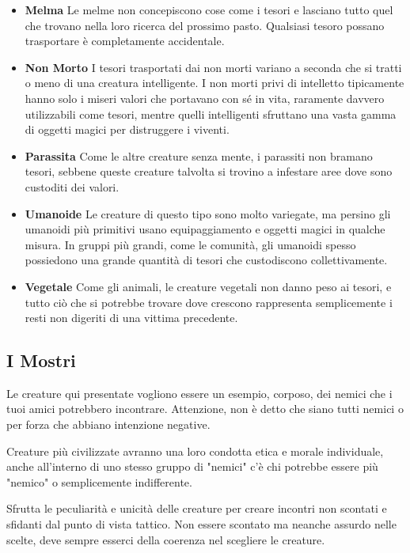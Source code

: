 \begin{multicols}{2}
\begin{itemize}
		\item \textbf{Melma}
		Le melme non concepiscono cose come i tesori e lasciano tutto quel che trovano nella loro ricerca del prossimo pasto. Qualsiasi tesoro possano trasportare è completamente accidentale.

		\item \textbf{Non Morto}
		I tesori trasportati dai non morti variano a seconda che si tratti o meno di una creatura intelligente. I non morti privi di intelletto tipicamente hanno solo i miseri valori che portavano con sé in vita, raramente davvero utilizzabili come tesori, mentre quelli intelligenti sfruttano una vasta gamma di oggetti magici per distruggere i viventi.

		\item \textbf{Parassita}
		Come le altre creature senza mente, i parassiti non bramano tesori, sebbene queste creature talvolta si trovino a infestare aree dove sono custoditi dei valori.

		\item \textbf{Umanoide}
		Le creature di questo tipo sono molto variegate, ma persino gli umanoidi più primitivi usano equipaggiamento e oggetti magici in qualche misura. In gruppi più grandi, come le comunità, gli umanoidi spesso possiedono una grande quantità di tesori che custodiscono collettivamente.

		\item \textbf{Vegetale}
		Come gli animali, le creature vegetali non danno peso ai tesori, e tutto ciò che si potrebbe trovare dove crescono rappresenta semplicemente i resti non digeriti di una vittima precedente.

	\end{itemize}

\end{multicols}

\pagebreak

\subsection{I Mostri}


\begin{changemargin}{0.3cm}{0.3cm}\begin{narratore}
		Le creature qui presentate vogliono essere un esempio, corposo, dei nemici che i tuoi amici potrebbero incontrare. Attenzione, non è detto che siano tutti nemici o per forza che abbiano intenzione negative.

		Creature più civilizzate avranno una loro condotta etica e morale individuale, anche all'interno di uno stesso gruppo di "nemici" c'è chi potrebbe essere più "nemico" o semplicemente indifferente.

		Sfrutta le peculiarità e unicità delle creature per creare incontri non scontati e sfidanti dal punto di vista tattico. Non essere scontato ma neanche assurdo nelle scelte, deve sempre esserci della coerenza nel scegliere le creature.
\end{narratore}\end{changemargin}


